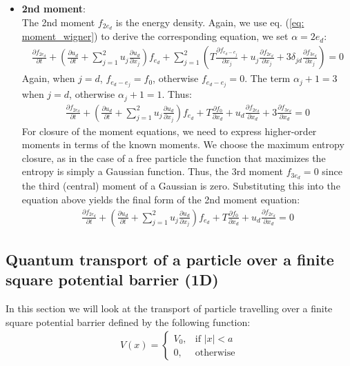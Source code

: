 \begin{itemize}
    \item \textbf{2nd moment}: \\
    The 2nd moment $f_{2 e_d}$ is the energy density. Again, we use eq. (\ref{eq: moment_wigner}) to derive the corresponding equation, we set $\alpha = 2 e_d$:
    \begin{gather}
        \frac{\partial f_{2 e_d}}{\partial t} + \left( \frac{\partial u_d}{\partial t} + \sum_{j=1}^{2} u_j \frac{\partial u_d}{\partial x_j} \right) f_{e_d} + \sum_{j=1}^{2} \left( T \frac{\partial f_{e_d - e_j}}{\partial x_j} + u_j \frac{\partial f_{2 e_d}}{\partial x_j} + 3 \delta_{j d} \frac{\partial f_{3 e_d}}{\partial x_j} \right) = 0
    \end{gather}
    Again, when $j = d$, $f_{e_d - e_j} = f_{0}$, otherwise $f_{e_d - e_j}=0$. The term $\alpha_j + 1 = 3$ when $j = d$, otherwise $\alpha_j + 1 = 1$. Thus:
    \begin{gather}
        \frac{\partial f_{2 e_d}}{\partial t} + \left( \frac{\partial u_d}{\partial t} + \sum_{j=1}^{2} u_j \frac{\partial u_d}{\partial x_j} \right) f_{e_d} + T \frac{\partial f_{0}}{\partial x_d} + u_d \frac{\partial f_{2 e_d}}{\partial x_d} + 3 \frac{\partial f_{3 e_d}}{\partial x_d} = 0
    \end{gather}
    For closure of the moment equations, we need to express higher-order moments in terms of the known moments. We choose the maximum entropy closure, as in the case of a free particle the function that maximizes the entropy is simply a Gaussian function. Thus, the 3rd moment $f_{3 e_d}=0$ since the third (central) moment of a Gaussian is zero. Substituting this into the equation above yields the final form of the 2nd moment equation:
    \begin{gather}
        \frac{\partial f_{2 e_d}}{\partial t} + \left( \frac{\partial u_d}{\partial t} + \sum_{j=1}^{2} u_j \frac{\partial u_d}{\partial x_j} \right) f_{e_d} + T \frac{\partial f_{0}}{\partial x_d} + u_d \frac{\partial f_{2 e_d}}{\partial x_d} = 0\label{eq: a3}
    \end{gather}
\end{itemize}

\subsection{Quantum transport of a particle over a finite square potential barrier (1D)}
In this section we will look at the transport of particle travelling over a finite square potential barrier defined by the following function:
\begin{gather}
    V(x) = \begin{cases}
        V_0, & \text{if } |x| < a \\
        0, & \text{otherwise}
    \end{cases} \label{eq: V}
\end{gather}

